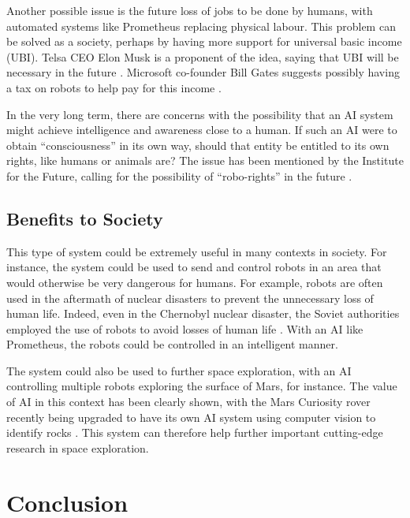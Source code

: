 \documentclass[titlepage,11pt]{article}
\begin{document}
Another possible issue is the future loss of jobs to be done by humans, with automated systems like Prometheus replacing physical labour. This problem can be solved as a society, perhaps by having more support for universal basic income (UBI). Telsa CEO Elon Musk is a proponent of the idea, saying that UBI will be necessary in the future \cite{musk}. Microsoft co-founder Bill Gates suggests possibly having a tax on robots to help pay for this income \cite{gates}.

In the very long term, there are concerns with the possibility that an AI system might achieve intelligence and awareness close to a human. If such an AI were to obtain ``consciousness'' in its own way, should that entity be entitled to its own rights, like humans or animals are? The issue has been mentioned by the Institute for the Future, calling for the possibility of ``robo-rights'' in the future \cite{robo_rights}.


\subsection{Benefits to Society}

This type of system could be extremely useful in many contexts in society. For instance, the system could be used to send and control robots in an area that would otherwise be very dangerous for humans. For example, robots are often used in the aftermath of nuclear disasters to prevent the unnecessary loss of human life. Indeed, even in the Chernobyl nuclear disaster, the Soviet authorities employed the use of robots to avoid losses of human life \cite{chernobyl}. With an AI like Prometheus, the robots could be controlled in an intelligent manner.

The system could also be used to further space exploration, with an AI controlling multiple robots exploring the surface of Mars, for instance. The value of AI in this context has been clearly shown, with the Mars Curiosity rover recently being upgraded to have its own AI system using computer vision to identify rocks \cite{rover}. This system can therefore help further important cutting-edge research in space exploration.

\section{Conclusion}
\end{document}
